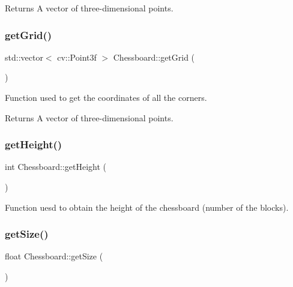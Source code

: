 \begin{DoxyReturn}{Returns}
A vector of three-\/dimensional points. 
\end{DoxyReturn}
\mbox{\label{class_chessboard_af81a2c5b8a5914ef625a7accd0f2462f}} 
\subsubsection{\texorpdfstring{get\+Grid()}{getGrid()}}
{\footnotesize\ttfamily std\+::vector$<$ cv\+::\+Point3f $>$ Chessboard\+::get\+Grid (\begin{DoxyParamCaption}{ }\end{DoxyParamCaption})}



Function used to get the coordinates of all the corners. 

\begin{DoxyReturn}{Returns}
A vector of three-\/dimensional points. 
\end{DoxyReturn}
\mbox{\label{class_chessboard_a5cbb8122bc0f8fc08d82e0541e01f7da}} 
\subsubsection{\texorpdfstring{get\+Height()}{getHeight()}}
{\footnotesize\ttfamily int Chessboard\+::get\+Height (\begin{DoxyParamCaption}{ }\end{DoxyParamCaption})}



Function uesd to obtain the height of the chessboard (number of the blocks). 

\mbox{\label{class_chessboard_a4640a7683d77d32621fa8821f1ec3d7d}} 
\subsubsection{\texorpdfstring{get\+Size()}{getSize()}}
{\footnotesize\ttfamily float Chessboard\+::get\+Size (\begin{DoxyParamCaption}{ }\end{DoxyParamCaption})}



